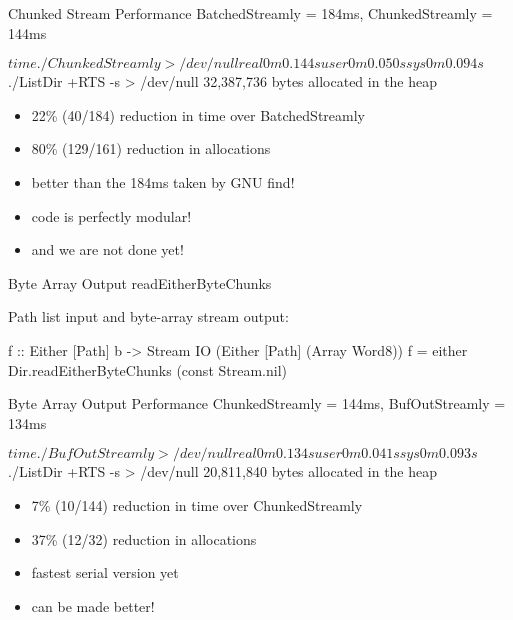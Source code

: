 \documentclass[17pt]{beamer}
\begin{document}
\begin{frame}[fragile]{Chunked Stream Performance}
{BatchedStreamly = 184ms, ChunkedStreamly = 144ms}

\begin{code}
$ time ./ChunkedStreamly > /dev/null
real    0m0.144s
user    0m0.050s
sys     0m0.094s

$ ./ListDir +RTS -s > /dev/null
      32,387,736 bytes allocated in the heap
\end{code}

\scriptsize
\begin{itemize}
\item 22\% (40/184) reduction in time over BatchedStreamly
\item 80\% (129/161) reduction in allocations
\item better than the 184ms taken by GNU find!
\item code is perfectly modular!
\item and we are not done yet!
\end{itemize}
\end{frame}

\begin{frame}[fragile]{Byte Array Output}
{readEitherByteChunks}

Path list input and byte-array stream output:
\begin{code}
f :: Either [Path] b
  -> Stream IO (Either [Path] (Array Word8))
f = either
      Dir.readEitherByteChunks
      (const Stream.nil)
\end{code}
\end{frame}

\begin{frame}[fragile]{Byte Array Output Performance}
{ChunkedStreamly = 144ms, BufOutStreamly = 134ms}

\begin{code}
$ time ./BufOutStreamly > /dev/null
real    0m0.134s
user    0m0.041s
sys     0m0.093s

$ ./ListDir +RTS -s > /dev/null
      20,811,840 bytes allocated in the heap
\end{code}

\scriptsize
\begin{itemize}
\item 7\% (10/144) reduction in time over ChunkedStreamly
\item 37\% (12/32) reduction in allocations
\item fastest serial version yet
\item can be made better!
\end{itemize}
\end{frame}
\end{document}
